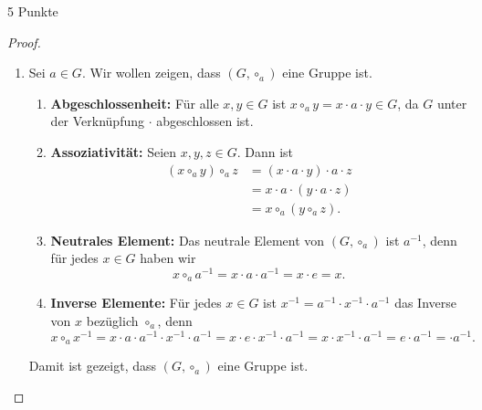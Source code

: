 \documentclass{problemset}
\begin{document}
\begin{problem} {5 Punkte}
\begin{proof}
\begin{enumerate}
        \item Sei $a \in G$. Wir wollen zeigen, dass $(G, \circ_a)$ eine Gruppe
              ist.
              \begin{enumerate}
                  \item \textbf{Abgeschlossenheit:} Für alle $x, y \in G$ ist $x \circ_a y = x \cdot a \cdot y \in G$, da $G$ unter der Verknüpfung $\cdot$ abgeschlossen ist.

                  \item \textbf{Assoziativität:} Seien $x, y, z \in G$. Dann ist
                        \begin{align*}
                            (x \circ_a y) \circ_a z & = (x \cdot a \cdot y) \cdot a \cdot z \\
                                                    & = x \cdot a \cdot (y \cdot a \cdot z) \\
                                                    & = x \circ_a (y \circ_a z).
                        \end{align*}

                  \item \textbf{Neutrales Element:} Das neutrale Element von $(G, \circ_a)$ ist $a^{-1}$, denn für jedes $x \in G$ haben wir
                        \[ x \circ_a a^{-1} = x \cdot a \cdot a^{-1} = x \cdot e = x. \]

                  \item \textbf{Inverse Elemente:} Für jedes $x \in G$ ist $x^{-1} = a^{-1} \cdot x^{-1} \cdot a^{-1}$ das Inverse von $x$ bezüglich $\circ_a$, denn
                        \[ x \circ_a x^{-1} = x \cdot a \cdot a^{-1} \cdot x^{-1} \cdot a^{-1} = x \cdot e \cdot x^{-1} \cdot a^{-1} =  x \cdot  x^{-1} \cdot a^{-1} = e \cdot a^{-1} = \cdot a^{-1}. \]

              \end{enumerate}
              Damit ist gezeigt, dass $(G, \circ_a)$ eine Gruppe ist. \checkmark
    \end{enumerate}
\end{proof}
\end{problem}
\end{document}
